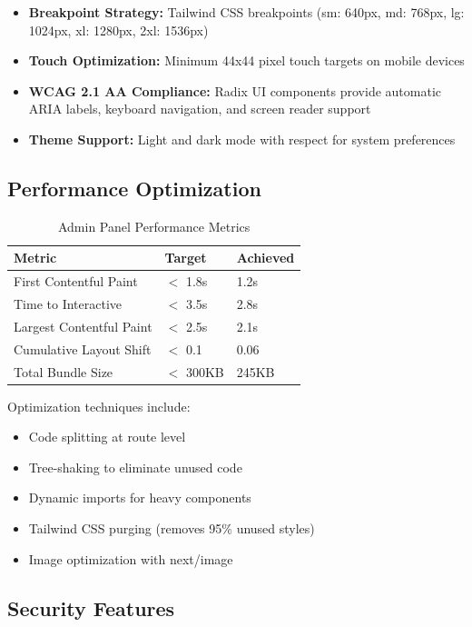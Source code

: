 \begin{itemize}
    \item \textbf{Breakpoint Strategy:} Tailwind CSS breakpoints (sm: 640px, md: 768px, lg: 1024px, xl: 1280px, 2xl: 1536px)
    \item \textbf{Touch Optimization:} Minimum 44x44 pixel touch targets on mobile devices
    \item \textbf{WCAG 2.1 AA Compliance:} Radix UI components provide automatic ARIA labels, keyboard navigation, and screen reader support
    \item \textbf{Theme Support:} Light and dark mode with respect for system preferences
\end{itemize}

\subsection{Performance Optimization}

\begin{table}[H]
\centering
\caption{Admin Panel Performance Metrics}
\begin{tabular}{|l|l|l|}
\hline

\textbf{Metric} & \textbf{Target} & \textbf{Achieved} \\
\hline
First Contentful Paint & $<$ 1.8s & 1.2s \\
\hline
Time to Interactive & $<$ 3.5s & 2.8s \\
\hline
Largest Contentful Paint & $<$ 2.5s & 2.1s \\
\hline
Cumulative Layout Shift & $<$ 0.1 & 0.06 \\
\hline
Total Bundle Size & $<$ 300KB & 245KB \\
\hline
\end{tabular}
\end{table}

Optimization techniques include:
\begin{itemize}
    \item Code splitting at route level
    \item Tree-shaking to eliminate unused code
    \item Dynamic imports for heavy components
    \item Tailwind CSS purging (removes 95\% unused styles)
    \item Image optimization with next/image
\end{itemize}

\subsection{Security Features}

